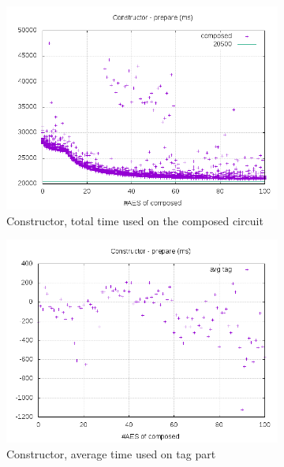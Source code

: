 \documentclass[10pt,a4paper]{article}
\begin{document}
\begin{figure}[h]
    \centering
    \begin{subfigure}[t]{0.3\textwidth}
        \includegraphics[width=\textwidth]{const_prepare_plots}
        \caption{Constructor, total time used on the composed circuit}
    \end{subfigure}
    \begin{subfigure}[t]{0.3\textwidth}
        \includegraphics[width=\textwidth]{const_prepare_avg}
        \caption{Constructor, average time used on tag part}
    \end{subfigure}
    \begin{subfigure}[t]{0.3\textwidth}

\end{subfigure}
\end{figure}
\end{document}
